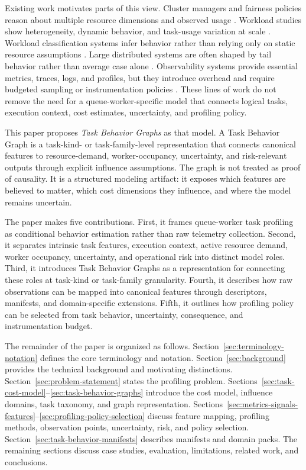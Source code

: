 Existing work motivates parts of this view. Cluster managers and fairness
policies reason about multiple resource dimensions and observed usage
\cite{verma2015borg,ghodsi2011drf}. Workload studies show heterogeneity,
dynamic behavior, and task-usage variation at scale
\cite{zhang2011taskusage,reiss2012heterogeneity,cheng2018alibaba}. Workload
classification systems infer behavior rather than relying only on static
resource assumptions \cite{delimitrou2013paragon,delimitrou2014quasar}. Large
distributed systems are often shaped by tail behavior rather than average case
alone \cite{dean2013tail}. Observability systems provide essential metrics,
traces, logs, and profiles, but they introduce overhead and require budgeted
sampling or instrumentation policies
\cite{sigelman2010dapper,opentelemetrySampling,opentelemetryPerformance}. These
lines of work do not remove the need for a queue-worker-specific model that
connects logical tasks, execution context, cost estimates, uncertainty, and
profiling policy.

This paper proposes \emph{Task Behavior Graphs} as that model. A Task Behavior
Graph is a task-kind- or task-family-level representation that connects
canonical features to resource-demand, worker-occupancy, uncertainty, and
risk-relevant outputs through explicit influence assumptions. The graph is not
treated as proof of causality. It is a structured modeling artifact: it exposes
which features are believed to matter, which cost dimensions they influence, and
where the model remains uncertain.

The paper makes five contributions. First, it frames queue-worker task profiling
as conditional behavior estimation rather than raw telemetry collection. Second,
it separates intrinsic task features, execution context, active resource demand,
worker occupancy, uncertainty, and operational risk into distinct model roles.
Third, it introduces Task Behavior Graphs as a representation for connecting
these roles at task-kind or task-family granularity. Fourth, it describes how
raw observations can be mapped into canonical features through descriptors,
manifests, and domain-specific extensions. Fifth, it outlines how profiling
policy can be selected from task behavior, uncertainty, consequence, and
instrumentation budget.

The remainder of the paper is organized as follows.
Section~\ref{sec:terminology-notation} defines the core terminology and
notation. Section~\ref{sec:background} provides the technical background and
motivating distinctions. Section~\ref{sec:problem-statement} states the
profiling problem. Sections~\ref{sec:task-cost-model}--\ref{sec:task-behavior-graphs}
introduce the cost model, influence domains, task taxonomy, and graph
representation. Sections~\ref{sec:metrics-signals-features}--\ref{sec:profiling-policy-selection}
discuss feature mapping, profiling methods, observation points, uncertainty,
risk, and policy selection. Section~\ref{sec:task-behavior-manifests} describes
manifests and domain packs. The remaining sections discuss case studies,
evaluation, limitations, related work, and conclusions.
